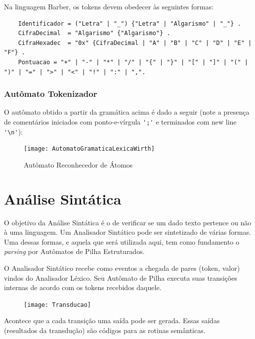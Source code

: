 \documentclass[a4paper,12pt]{report}
\begin{document}
    Na linguagem Barber, os tokens devem obedecer às seguintes formas:

    \begin{lstlisting}
    Identificador = ("Letra" | "_") {"Letra" | "Algarismo" | "_"} .
    CifraDecimal  = "Algarismo" {"Algarismo"} .
    CifraHexadec  = "0x" {CifraDecimal | "A" | "B" | "C" | "D" | "E" | "F"} .
    Pontuacao = "+" | "-" | "*" | "/" | "{" | "}" | "[" | "]" | "(" | ")" | "=" | ">" | "<" | "!" | ":" | ",".
    \end{lstlisting}

    \subsection*{Autômato Tokenizador}
    O autômato obtido a partir da gramática acima é dado a seguir (note a presença de comentários iniciados com ponto-e-vírgula \verb|';'| e terminados com new line \verb|'\n'|):

    \begin{figure}[h]
        \centering
        \caption{Autômato Reconhecedor de Átomos}
        \texttt{[image: AutomatoGramaticaLexicaWirth]}
    \end{figure}


    \chapter*{Análise Sintática}
    O objetivo da Análise Sintática é o de verificar se um dado texto pertence ou não à uma linguagem. Um Analisador Sintático pode ser sintetizado de várias formas. Uma dessas formas, e aquela que será utilizada aqui, tem como fundamento o \textit{parsing} por Autômatos de Pilha Estruturados.

    O Analisador Sintático recebe como eventos a chegada de pares (token, valor) vindos do Analisador Léxico. Seu Autômato de Pilha executa suas transições internas de acordo com os tokens recebidos daquele.

    \begin{figure}[h]
        \centering
        \texttt{[image: Transducao]}
    \end{figure}

    Acontece que a cada transição uma saída pode ser gerada. Essas saídas (resultados da transdução) são códigos para as rotinas semânticas.
\end{document}
